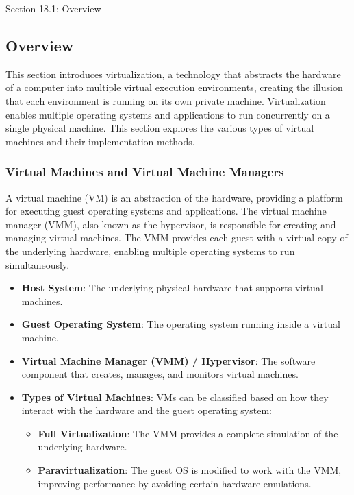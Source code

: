 \begin{notes}{Section 18.1: Overview}
    \subsection*{Overview}

    This section introduces virtualization, a technology that abstracts the hardware of a computer into multiple virtual execution environments, creating the illusion that each environment is running 
    on its own private machine. Virtualization enables multiple operating systems and applications to run concurrently on a single physical machine. This section explores the various types of virtual 
    machines and their implementation methods.
    
    \subsubsection*{Virtual Machines and Virtual Machine Managers}
    
    A virtual machine (VM) is an abstraction of the hardware, providing a platform for executing guest operating systems and applications. The virtual machine manager (VMM), also known as the hypervisor, 
    is responsible for creating and managing virtual machines. The VMM provides each guest with a virtual copy of the underlying hardware, enabling multiple operating systems to run simultaneously.
    
    \begin{highlight}
    
        \begin{itemize}
            \item \textbf{Host System}: The underlying physical hardware that supports virtual machines.
            \item \textbf{Guest Operating System}: The operating system running inside a virtual machine.
            \item \textbf{Virtual Machine Manager (VMM) / Hypervisor}: The software component that creates, manages, and monitors virtual machines.
            \item \textbf{Types of Virtual Machines}: VMs can be classified based on how they interact with the hardware and the guest operating system:
                \begin{itemize}
                    \item \textbf{Full Virtualization}: The VMM provides a complete simulation of the underlying hardware.
                    \item \textbf{Paravirtualization}: The guest OS is modified to work with the VMM, improving performance by avoiding certain hardware emulations.
                \end{itemize}
        \end{itemize}
    

\end{highlight}
\end{notes}
